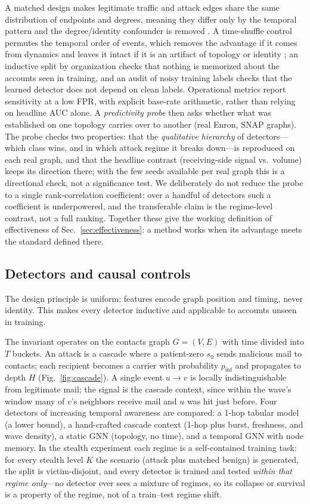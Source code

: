 A matched design makes legitimate traffic and attack edges share the same
distribution of endpoints and degrees, meaning they differ only by the temporal pattern and the
degree/identity confounder is removed \citep{arp2022dos}. A time-shuffle control permutes the temporal order of
events, which removes the advantage if it comes from dynamics and leaves it intact if it is an artifact of
topology or identity \citep{pendlebury2019tesseract}; an inductive split by organization checks that nothing is memorized about
the accounts seen in training, and an audit of noisy training labels checks that the learned detector does not
depend on clean labels. Operational metrics report sensitivity at a low FPR, with explicit base-rate
arithmetic, rather than relying on headline AUC alone. A \emph{predictivity probe} then asks whether what was established on one
topology carries over to another (real Enron, SNAP graphs). The probe checks two properties: that the
\emph{qualitative hierarchy} of detectors---which class wins, and in which attack regime it breaks down---is
reproduced on each real graph, and that the headline contrast (receiving-side signal vs.\ volume) keeps its
direction there; with the few seeds available per real graph this is a directional check, not a
significance test. We deliberately do not reduce the probe to a single rank-correlation
coefficient: over a handful of detectors such a coefficient is underpowered, and the transferable claim is the
regime-level contrast, not a full ranking. Together these give the working definition of effectiveness of
Sec.~\ref{sec:effectiveness}: a method works when its advantage meets the standard defined there.

\subsection{Detectors and causal controls}
\label{sec:m-detectors}
The design principle is uniform: features encode graph position and timing, never identity. This makes every detector
inductive and applicable to accounts unseen in training.

\smallskip The invariant operates on the contacts graph
$G=(V,E)$ with time divided into $T$ buckets. An attack is a cascade where a patient-zero $s_0$ sends malicious mail
to contacts; each recipient becomes a carrier with probability $p_\mathrm{inf}$ and propagates to depth $H$
(Fig.~\ref{fig:cascade}). A single event $u\!\to\!v$ is locally indistinguishable from legitimate mail; the
signal is the cascade context, since within the wave's window many of $v$'s neighbors receive mail and $u$ was
hit just before. Four detectors of increasing temporal awareness are compared: a 1-hop tabular model (a lower
bound), a hand-crafted cascade context (1-hop plus burst, freshness, and wave density), a static GNN (topology,
no time), and a temporal GNN with node memory. In the stealth experiment each regime is a self-contained
training task: for every stealth level $K$ the scenario (attack plus matched benign) is generated, the split is
victim-disjoint, and every detector is trained and tested \emph{within that regime only}---no detector ever
sees a mixture of regimes, so its collapse or survival is a property of the regime, not of a train--test
regime shift.

